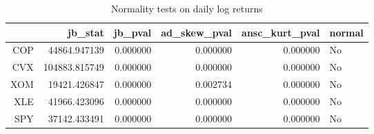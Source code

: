 \begin{table}[ht]
\centering
\caption{Normality tests on daily log returns} 
\label{tab:normality}
\begin{tabular}{rrrrrl}
  \toprule
 & jb\_stat & jb\_pval & ad\_skew\_pval & ansc\_kurt\_pval & normal \\ 
  \midrule
COP & 44864.947139 & 0.000000 & 0.000000 & 0.000000 & No \\ 
  CVX & 104883.815749 & 0.000000 & 0.000000 & 0.000000 & No \\ 
  XOM & 19421.426847 & 0.000000 & 0.002734 & 0.000000 & No \\ 
  XLE & 41966.423096 & 0.000000 & 0.000000 & 0.000000 & No \\ 
  SPY & 37142.433491 & 0.000000 & 0.000000 & 0.000000 & No \\ 
   \bottomrule
\end{tabular}
\end{table}
